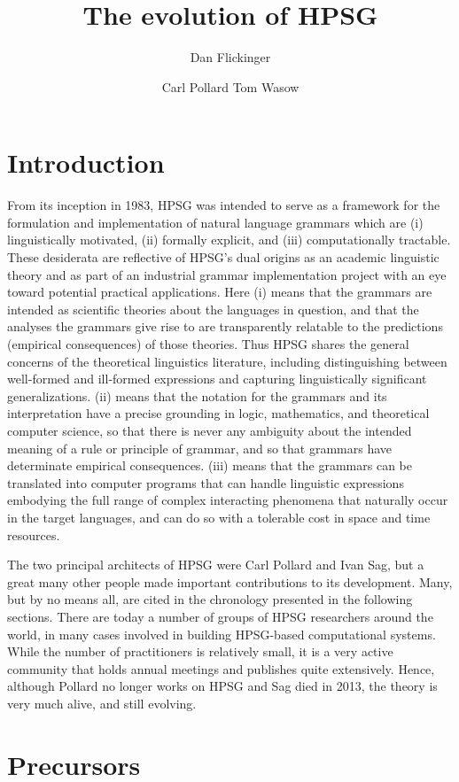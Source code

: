 \documentclass[output=paper]{langsci/langscibook}
\title{The evolution of HPSG}
\author{%
	Dan Flickinger\affiliation{Stanford University}%
	\and Carl Pollard\affiliation{Ohio State Universitiy}
	\lastand Tom Wasow\affiliation{Stanford University}%
}
\begin{document}
\label{chap-evolution}


\section*{Introduction} 

From its inception in 1983, HPSG was intended to serve as a framework for the formulation and implementation of natural language grammars which are (i) linguistically motivated, (ii)
formally explicit, and (iii) computationally tractable. These desiderata are reflective of HPSG's dual origins as an academic linguistic theory and as part of an industrial grammar implementation project with an eye toward potential practical applications. Here (i) means that the grammars are intended as scientific theories about the languages in question, and that the analyses the grammars give rise to are transparently relatable to the predictions (empirical consequences) of those theories. Thus HPSG shares the general concerns of the theoretical linguistics literature, including distinguishing between well-formed and ill-formed expressions and capturing linguistically significant generalizations.  (ii) means that the notation for the grammars and its interpretation have a precise grounding in logic, mathematics, and theoretical computer science, so that there is never any ambiguity about the intended meaning of a rule or principle of grammar, and so that grammars have determinate empirical consequences. (iii) means that the grammars can be translated into computer programs that can handle linguistic expressions embodying the full range of complex interacting phenomena that naturally occur in the target languages, and can do so with a tolerable cost in space and time resources.

The two principal architects of HPSG were Carl Pollard and Ivan Sag, but a great many other people made important contributions to its development.  Many, but by no means all, are cited in the chronology presented in the following sections.  There are today a number of groups of HPSG researchers around the world, in many cases involved in building HPSG-based computational systems.  While the number of practitioners is relatively small, it is a very active community that holds annual meetings and publishes quite extensively.  Hence, although Pollard no longer works on HPSG and Sag died in 2013, the theory is very much alive, and still evolving. 

\section{Precursors}
\end{document}

